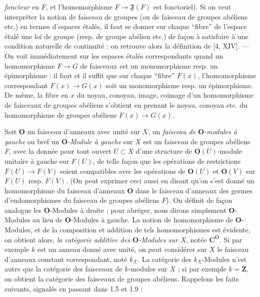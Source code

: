 
\noindent \textit{foncteur} en $F$, et l'homomorphisme
$F\to\mathfrak F(F)$ est fonctoriel). Si on veut
interpréter la notion de faisceau de groupes (ou de faisceau de groupes
abéliens etc.) en termes d'espaces étalés, il faut se donner sur chaque
``fibre'' de l'espace étalé une loi de groupe (resp. de groupe abélien
etc.) de façon à satisfaire à une condition naturelle de continuité : on
retrouve alors la définition de [4, XIV].
--- On voit immédiatement sur les espaces étalés correspondants quand un
homomorphisme $F\to G$ de faisceaux est un monomorphisme resp. un
épimorphisme : il faut et il suffit que sur chaque ``fibre'' $F(x)$,
l'homomorphisme correspondant $F(x)\to G(x)$ soit un
monomorphisme resp. un épimorphisme. De même, la fibre en $x$ du noyau,
conoyau, image, coimage d'un homomorphisme de faisceaux de groupes abéliens
s'obtient en prenant le noyau, conoyau etc. du homomorphisme de groupes
abéliens $F(x)\to G(x)$.

Soit $\mathbf O$ un faisceau d'anneaux avec unité sur $X$, un
\textit{faisceau de $\mathbf O$-modules à gauche} ou bref un
\textit{$\mathbf O$-Module à gauche} sur $X$ est un faisceau de groupes abéliens $F$,
avec la donnée pour tout ouvert $U\subset X$ d'une structure de
$\mathbf O(U)$-module unitaire à gauche sur $F(U)$, de telle façon que les
opérations de restrictions $F(U)\to F(V)$ soient compatibles
avec les opérations de $\mathbf O(U)$ et $\mathbf O(V)$ sur $F(U)$ resp.
$F(V)$. (On peut exprimer ceci aussi en disant qu'on s'est donné un
homomorphisme du faisceau d'anneaux $\mathbf O$ dans le faisceau d'anneaux des
germes d'endomorphismes du faisceau de groupes abéliens $F$).
On définit de façon analogue les $\mathbf O$-Modules à droite ; pour abréger,
nous dirons simplement $\mathbf O$-Modules au lieu de $\mathbf O$-Modules à
gauche. La notion de homomorphisme de $\mathbf O$-Modules, et de la
composition et addition de tels homomorphismes est évidente, on obtient
alors, \textit{la catégorie additive des $\mathbf O$-Modules sur $X$}, notée
$\mathbf C^{\mathbf O}$. Si par exemple $k$ est un anneau donné avec unité, on peut
considérer sur $X$ le faisceau d'anneaux constant correspondant, noté $k_X$.
La catégorie des $k_X$-Modules n'est autre que la catégorie des faisceaux de
$k$-modules sur $X$ ; si par exemple $k=\mathbf Z$, on obtient la catégorie
des faisceaux de groupes abéliens. Rappelons les faits suivants, signalés en
passant dans 1.5 et 1.9 :

